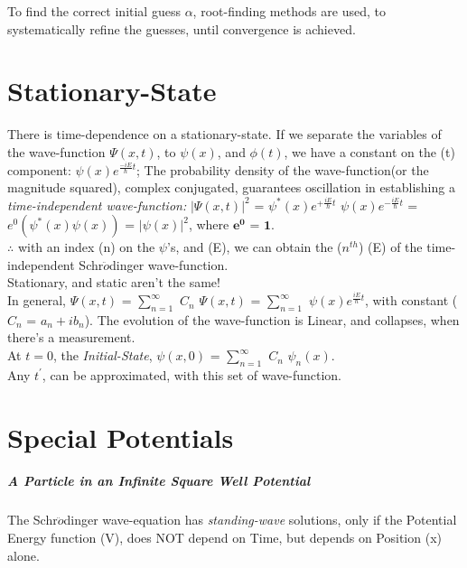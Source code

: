 \documentclass[a4paper, 10pt, onepage]{elegantbook}
\begin{document}
{To find the correct initial guess $\alpha$, root-finding methods are used, to systematically refine the guesses, until convergence is achieved.

\chapter{Stationary-State}

There is time-dependence on a stationary-state. If we separate the variables of the wave-function $\Psi(x,t)$, to $\psi(x)$, and $\phi(t)$, we have a constant on the (t) component: $\psi(x)e^{\frac{-i E}{\hbar}t}$; The probability density of the wave-function(or the magnitude squared), complex conjugated, guarantees oscillation in establishing a \emph{time-independent wave-function:} $\Big| \Psi(x,t) \Big|^2$ = $\psi^{*}(x) e^{ + \frac{i E}{\hbar}t}$ \quad $\psi(x) e^{ - \frac{i E}{\hbar}t}$ = $e^{0} (\psi^{*}(x) \psi(x))$ = $\Big| \psi(x) \Big|^2$, where $\mathbf{e^{0}}$ = $\mathbf{1}$.  \\
$\therefore$ with an index (n) on the $\psi$'s, and (E), we can obtain the ($n^{th}$) (E) of the time-independent Schr$\ddot{o}$dinger wave-function.  \\
Stationary, and static aren't the same! \\

In general, $\Psi(x,t)$ = $\sum_{n = 1}^\infty$ $C_n$ $\Psi(x,t)$ = $\sum_{n = 1}^\infty$ $\psi(x) e^{\frac{i E}{\hbar}t}$, with constant ($C_n$ = $a_n + i b_n$). The evolution of the wave-function is Linear, and collapses, when there's a measurement.  \\
At $t = 0$, the \emph{Initial-State}, $\psi(x,0)$ = $\sum_{n = 1}^\infty$ $C_n$ $\psi_{n} (x)$.  \\
Any $t^{'}$, can be approximated, with this set of wave-function.

\newpage

\chapter{Special Potentials}
\label{ch:Special Potentials}
\paragraph{A Particle in an Infinite Square Well Potential}

\noindent

The Schr$\ddot{o}$dinger wave-equation has \emph{standing-wave} solutions, only if the Potential Energy function (V), does NOT depend on Time, but depends on Position (x) alone. \\

}
\end{document}
